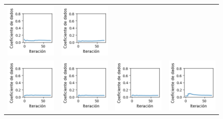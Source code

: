 \begin{figure}[!b]
\begin{tabular}{cccc}
        \includegraphics[width=3.5cm]{../Plots/dl_epoch_6.png} &
        \includegraphics[width=3.5cm]{../Plots/dl_epoch_7.png} \\
        \includegraphics[width=3.5cm]{../Plots/dl_epoch_8.png} &

        \includegraphics[width=3.5cm]{../Plots/dl_epoch_9.png} &
        \includegraphics[width=3.5cm]{../Plots/dl_epoch_10.png} &
        \includegraphics[width=3.5cm]{../Plots/dl_epoch_11.png} \\


\end{tabular}
\end{figure}
